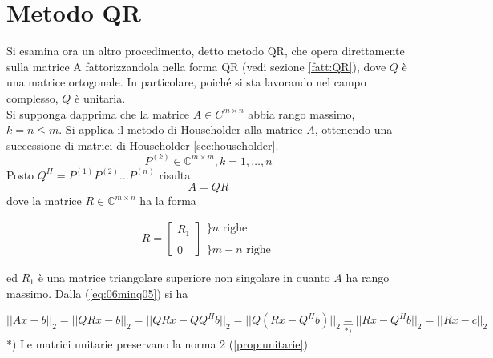 \section{Metodo QR} 
Si esamina ora un altro procedimento, detto metodo QR, che opera
direttamente sulla matrice A fattorizzandola nella forma QR (vedi sezione
\ref{fatt:QR}), dove $Q$ \`e una matrice ortogonale.  In particolare,
poich\'e si sta lavorando nel campo complesso, $Q$ \`e unitaria. \\
Si supponga dapprima che la matrice $A \in C^{m\times n} $ abbia rango
massimo, $k = n \leq m$.  Si applica il metodo di Householder alla
matrice $A$, ottenendo una successione di matrici di Householder 
\ref{sec:householder}.
$$ P^{(k)} \in \mathbb{C}^{m \times m }, k =1, \ldots, n$$
Posto $Q^{H} = P^{(1)} P^{(2)}\ldots P^{(n)}$ risulta
\begin{equation}
  \label{eq:06minq05} A=QR
\end{equation} 
dove la matrice $R \in \mathbb{C}^{m \times n}$ ha la forma

\begin{equation}
  \label{eq:06minq06} R = \left[
\begin{array}{l} R_1 \\ \\ 0
\end{array} \right]
\begin{array}{l} \}n \text{ righe} \\ \\ \}m-n \text{ righe}
\end{array}
\end{equation}

ed $R_1$ \`e una matrice triangolare superiore non singolare in quanto
$A$ ha rango massimo. Dalla (\ref{eq:06minq05}) si ha

\begin{equation}
  \label{eq:06minq07} 
  || Ax - b ||_2 = ||QRx - b||_2 = 
  ||QRx - QQ^{H}b||_2 = ||Q(Rx - Q^{H}b)||_2 \underbracket{=}_{*)} ||Rx - Q^{H}b||_2 = 
  ||Rx - c||_2
\end{equation}
*) Le matrici unitarie preservano la norma 2 (\ref{prop:unitarie})\\

